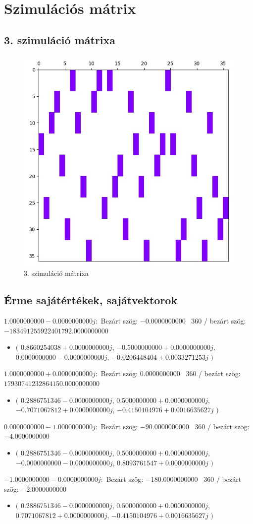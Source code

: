 \documentclass[14pt,a4paper]{article}
\begin{document}
\section{Szimulációs mátrix}
\subsection{3. szimuláció mátrixa}
\begin{figure}[H]
\centering
\includegraphics[width = 0.7\columnwidth]{sim_03/simulation_matrix.jpg}
\caption{3. szimuláció mátrixa}
\end{figure}
\subsection{Érme sajátértékek, sajátvektorok}
$1.0000000000-0.0000000000j$:\
Bezárt szög: $-0.0000000000$ \
360 / bezárt szög: $-183491255922401792.0000000000$\
\begin{itemize}
\item
$\big($
$0.8660254038+0.0000000000j$, $-0.5000000000+0.0000000000j$, $0.0000000000-0.0000000000j$, $-0.0206448404+0.0033271253j$
$\big)$
\end{itemize}
$1.0000000000+0.0000000000j$:\
Bezárt szög: $0.0000000000$ \
360 / bezárt szög: $17930741232864150.0000000000$\
\begin{itemize}
\item
$\big($
$0.2886751346-0.0000000000j$, $0.5000000000+0.0000000000j$, $-0.7071067812+0.0000000000j$, $-0.4150104976+0.0016635627j$
$\big)$
\end{itemize}
$0.0000000000-1.0000000000j$:\
Bezárt szög: $-90.0000000000$ \
360 / bezárt szög: $-4.0000000000$\
\begin{itemize}
\item
$\big($
$0.2886751346-0.0000000000j$, $0.5000000000+0.0000000000j$, $-0.0000000000-0.0000000000j$, $0.8093761547+0.0000000000j$
$\big)$
\end{itemize}
$-1.0000000000-0.0000000000j$:\
Bezárt szög: $-180.0000000000$ \
360 / bezárt szög: $-2.0000000000$\
\begin{itemize}
\item
$\big($
$0.2886751346-0.0000000000j$, $0.5000000000+0.0000000000j$, $0.7071067812+0.0000000000j$, $-0.4150104976+0.0016635627j$
$\big)$
\end{itemize}
\end{document}
